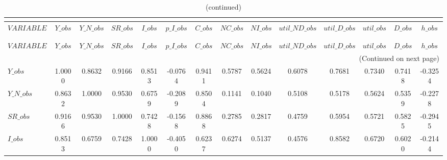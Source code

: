  
\begin{center}
\begin{longtable}{lccccccccccccc} 
\caption{CORRELATION OF SIMULATED VARIABLES}\\
 \label{Table:sim_corr_matrix}\\
\toprule 
$VARIABLE       $	 & 	 $          Y\_obs$	 & 	 $      Y\_N\_obs$	 & 	 $         SR\_obs$	 & 	 $          I\_obs$	 & 	 $      p\_I\_obs$	 & 	 $          C\_obs$	 & 	 $         NC\_obs$	 & 	 $         NI\_obs$	 & 	 $  util\_ND\_obs$	 & 	 $   util\_D\_obs$	 & 	 $       util\_obs$	 & 	 $          D\_obs$	 & 	 $          h\_obs$\\
\midrule \endfirsthead 
\caption{(continued)}\\
 \toprule \\ 
$VARIABLE       $	 & 	 $          Y\_obs$	 & 	 $      Y\_N\_obs$	 & 	 $         SR\_obs$	 & 	 $          I\_obs$	 & 	 $      p\_I\_obs$	 & 	 $          C\_obs$	 & 	 $         NC\_obs$	 & 	 $         NI\_obs$	 & 	 $  util\_ND\_obs$	 & 	 $   util\_D\_obs$	 & 	 $       util\_obs$	 & 	 $          D\_obs$	 & 	 $          h\_obs$\\
\midrule \endhead 
\midrule \multicolumn{14}{r}{(Continued on next page)} \\ \bottomrule \endfoot 
\bottomrule \endlastfoot 
$Y\_obs         $	 & 	           1.0000	 & 	           0.8632	 & 	           0.9166	 & 	           0.8513	 & 	          -0.0764	 & 	           0.9411	 & 	           0.5787	 & 	           0.5624	 & 	           0.6078	 & 	           0.7681	 & 	           0.7340	 & 	           0.7418	 & 	          -0.3254 \\ 
$Y\_N\_obs      $	 & 	           0.8632	 & 	           1.0000	 & 	           0.9530	 & 	           0.6759	 & 	          -0.2089	 & 	           0.8504	 & 	           0.1141	 & 	           0.1040	 & 	           0.5108	 & 	           0.5178	 & 	           0.5624	 & 	           0.5359	 & 	          -0.2278 \\ 
$SR\_obs        $	 & 	           0.9166	 & 	           0.9530	 & 	           1.0000	 & 	           0.7428	 & 	          -0.1568	 & 	           0.8868	 & 	           0.2785	 & 	           0.2817	 & 	           0.4759	 & 	           0.5954	 & 	           0.5721	 & 	           0.5825	 & 	          -0.2945 \\ 
$I\_obs         $	 & 	           0.8513	 & 	           0.6759	 & 	           0.7428	 & 	           1.0000	 & 	          -0.4050	 & 	           0.6237	 & 	           0.6274	 & 	           0.5137	 & 	           0.4576	 & 	           0.8582	 & 	           0.6720	 & 	           0.6020	 & 	          -0.2144 \\ 

\end{longtable}
\end{center}
